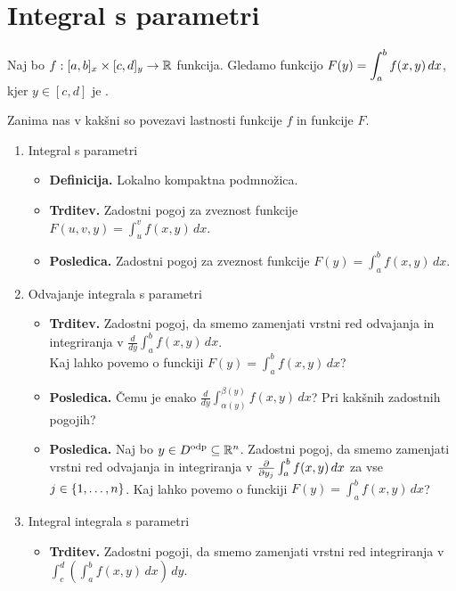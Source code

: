 \section{Integral s parametri}
Naj bo $f:[a,b]_x \times [c,d]_y \to \mathbb{R}$ funkcija. Gledamo funkcijo $\displaystyle F(y) = \int_{a}^{b}f(x,y) \, dx$, kjer $y \in [c,d]$ je .

Zanima nas v kakšni so povezavi lastnosti funkcije $f$ in funkcije $F$.

\begin{enumerate}
    \item Integral s parametri
    \begin{itemize}
        \item \colorbox{purple!30}{\textbf{Definicija.}} Lokalno kompaktna podmnožica.
        \item \colorbox{blue!30}{\textbf{Trditev.}} Zadostni pogoj za zveznost funkcije $F(u,v,y) = \int_{u}^{v}f(x,y) \, dx$.
        \item \colorbox{orange!30}{\textbf{Posledica.}} Zadostni pogoj za zveznost funkcije $F(y) = \int_{a}^{b}f(x,y) \, dx$.
    \end{itemize}
    \item Odvajanje integrala s parametri
    \begin{itemize}
        \item \colorbox{blue!30}{\textbf{Trditev.}} Zadostni pogoj, da smemo zamenjati vrstni red odvajanja in integriranja v \(\frac{d}{dy} \int_{a}^{b}f(x,y) \, dx\). \\ Kaj lahko povemo o funckiji $F(y) = \int_{a}^{b}f(x,y) \, dx$?
        \item \colorbox{orange!30}{\textbf{Posledica.}} Čemu je enako \(\frac{d}{dy} \int_{\alpha(y)}^{\beta(y)}f(x,y) \, dx\)? Pri kakšnih zadostnih pogojih?
        \item \colorbox{orange!30}{\textbf{Posledica.}} Naj bo \(y \in D^\text{odp} \subseteq \mathbb{R}^n\). Zadostni pogoj, da smemo zamenjati vrstni red odvajanja in integriranja v \(\frac{\partial }{\partial y_j} \int_{a}^{b}f(x,y) \, dx\) za vse \(j \in \left\{1, \ldots, n\right\}\).  Kaj lahko povemo o funckiji $F(y) = \int_{a}^{b}f(x,y) \, dx$?
    \end{itemize}

    \item Integral integrala s parametri
    \begin{itemize}
        \item \colorbox{blue!30}{\textbf{Trditev.}} Zadostni pogoji, da smemo zamenjati vrstni red integriranja v \(\int_{c}^{d} \left(\int_{a}^{b} f(x,y) \,dx \right) \,dy\).
    \end{itemize}


\end{enumerate}
